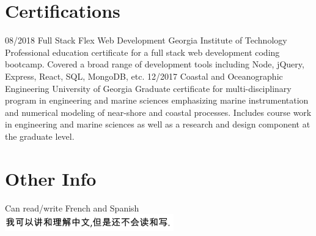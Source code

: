 \documentclass[]{resume}
\begin{document}
			\section{Certifications}
			\begin{entrylist}
				\entry
				{08/2018}
				{Full Stack Flex Web Development}
				{Georgia Institute of Technology}
				{Professional education certificate for a full stack web development coding bootcamp. Covered a broad range of development tools including Node, jQuery, Express, React, SQL, MongoDB, etc.}
				\entry
				{12/2017}
				{Coastal and Oceanographic Engineering}
				{University of Georgia}
				{Graduate certificate for multi-disciplinary program in engineering and marine sciences emphasizing marine instrumentation and numerical modeling of near-shore and coastal processes. Includes course work in engineering and marine sciences as well as a research and design component at the graduate level.}
			\end{entrylist}
			
			\section{Other Info}
			Can read/write French and Spanish\\
			\emph{\includegraphics[scale=1]{img/Chinese.PNG}}\\
\end{document}
